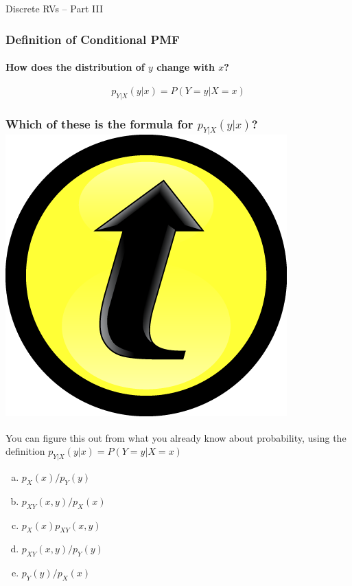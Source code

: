 \documentclass[handout]{beamer}
\date{Lecture \# 10}
\begin{document}
 


\begin{frame}[plain]
	\titlepage 
	

\end{frame} 

\begin{frame}

\centering \Huge Discrete RVs -- Part III

\end{frame}

\begin{frame}
\frametitle{Definition of Conditional PMF}
\framesubtitle{How does the distribution of $y$ change with $x$?}

\Large
$$\boxed{p_{Y|X}(y|x) = P(Y=y|X=x)}$$


\end{frame}
\begin{frame}
\frametitle{Which of these is the formula for $p_{Y|X}(y|x)$? \hfill \includegraphics[scale = 0.05]{./images/clicker}}
You can figure this out from what you already know about probability, using the definition $p_{Y|X}(y|x) = P(Y=y|X=x)$

\vspace{1em}

\begin{enumerate}[(a)]
\item $p_X(x)/p_Y(y)$
\item $p_{XY}(x,y)/p_X(x)$
\item $p_X(x)p_{XY}(x,y)$
\item $p_{XY}(x,y)/p_Y(y)$
\item $p_Y(y)/p_X(x)$
\end{enumerate}

\end{frame}
\end{document}

